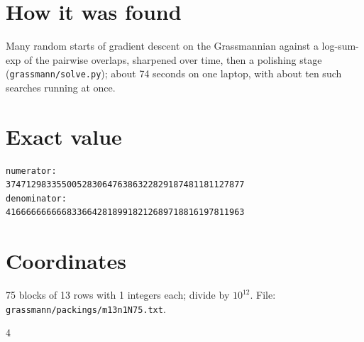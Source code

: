 \documentclass[11pt,a4paper]{article}
\begin{document}
\section{How it was found}
Many random starts of gradient descent on the Grassmannian against a log-sum-exp of the pairwise overlaps, sharpened over time, then a polishing stage (\texttt{grassmann/solve.py}); about 74 seconds on one laptop, with about ten such searches running at once.


\appendix
\section{Exact value}
{\small
\begin{verbatim}
numerator:
37471298335500528306476386322829187481181127877
denominator:
41666666666683366428189918212689718816197811963
\end{verbatim}}

\section{Coordinates}
75 blocks of 13 rows with 1 integers each; divide by $10^{12}$. File: \texttt{grassmann/packings/m13n1N75.txt}.
{\tiny
\begin{multicols}{4}
\end{multicols}}
\end{document}
